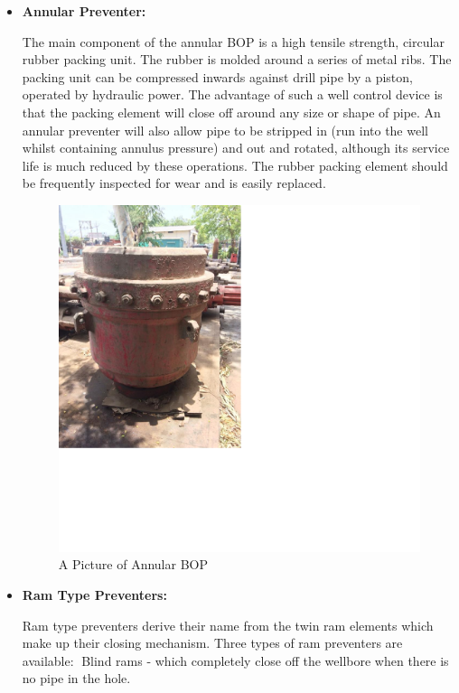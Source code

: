 \begin{itemize}
\item \textbf{Annular Preventer:}

 The main component of the
annular BOP is a high tensile strength, circular rubber
packing unit. The rubber is molded around a series of
metal ribs. The packing unit can be compressed
inwards against drill pipe by a piston, operated by
hydraulic power. The advantage of such a well
control device is that the packing element will close
off around any size or shape of pipe. An annular
preventer will also allow pipe to be stripped in (run
into the well whilst containing annulus pressure) and
out and rotated, although its service life is much
reduced by these operations. The rubber packing
element should be frequently inspected for wear and
is easily replaced.

\vspace{1em}

\begin{figure}[h]
\includegraphics[scale=0.3]{images/annularbop}
\centering 
\caption{A Picture of Annular BOP}
\end{figure}

\item \textbf{Ram Type Preventers:}

 Ram type preventers derive their name
from the twin ram elements which make up their closing
mechanism. Three types of ram preventers are available: Blind rams - which completely close off the wellbore when
there is no pipe in the hole.

\vspace{1em}
 \end{itemize}

